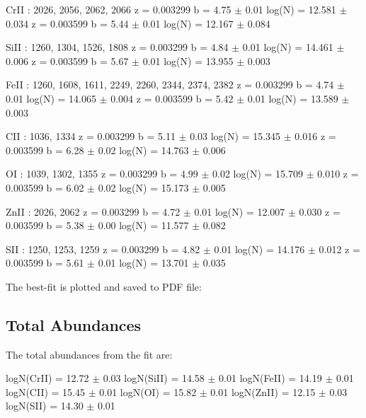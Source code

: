 \documentclass[letterpaper,10pt,english]{sphinxmanual}
\begin{document}
%
\begin{sphinxVerbatim}[commandchars=\\\{\}]
CrII : 2026, 2056, 2062, 2066
    z = 0.003299    b = 4.75 \(\pm\) 0.01  log(N) = 12.581 \(\pm\) 0.034
    z = 0.003599    b = 5.44 \(\pm\) 0.01  log(N) = 12.167 \(\pm\) 0.084

SiII : 1260, 1304, 1526, 1808
    z = 0.003299    b = 4.84 \(\pm\) 0.01  log(N) = 14.461 \(\pm\) 0.006
    z = 0.003599    b = 5.67 \(\pm\) 0.01  log(N) = 13.955 \(\pm\) 0.003

FeII : 1260, 1608, 1611, 2249, 2260, 2344, 2374, 2382
    z = 0.003299    b = 4.74 \(\pm\) 0.01  log(N) = 14.065 \(\pm\) 0.004
    z = 0.003599    b = 5.42 \(\pm\) 0.01  log(N) = 13.589 \(\pm\) 0.003

CII : 1036, 1334
    z = 0.003299    b = 5.11 \(\pm\) 0.03  log(N) = 15.345 \(\pm\) 0.016
    z = 0.003599    b = 6.28 \(\pm\) 0.02  log(N) = 14.763 \(\pm\) 0.006

OI : 1039, 1302, 1355
    z = 0.003299    b = 4.99 \(\pm\) 0.02  log(N) = 15.709 \(\pm\) 0.010
    z = 0.003599    b = 6.02 \(\pm\) 0.02  log(N) = 15.173 \(\pm\) 0.005

ZnII : 2026, 2062
    z = 0.003299    b = 4.72 \(\pm\) 0.01  log(N) = 12.007 \(\pm\) 0.030
    z = 0.003599    b = 5.38 \(\pm\) 0.00  log(N) = 11.577 \(\pm\) 0.082

SII : 1250, 1253, 1259
    z = 0.003299    b = 4.82 \(\pm\) 0.01  log(N) = 14.176 \(\pm\) 0.012
    z = 0.003599    b = 5.61 \(\pm\) 0.01  log(N) = 13.701 \(\pm\) 0.035
\end{sphinxVerbatim}

The best-fit is plotted and saved to PDF file:  


\subsection{Total Abundances}
\label{\detokenize{physical_model_results:total-abundances}}
The total abundances from the fit are:

%
\begin{sphinxVerbatim}[commandchars=\\\{\}]
logN(CrII) = 12.72 \(\pm\) 0.03
logN(SiII) = 14.58 \(\pm\) 0.01
logN(FeII) = 14.19 \(\pm\) 0.01
logN(CII) = 15.45 \(\pm\) 0.01
logN(OI) = 15.82 \(\pm\) 0.01
logN(ZnII) = 12.15 \(\pm\) 0.03
logN(SII) = 14.30 \(\pm\) 0.01
\end{sphinxVerbatim}
\end{document}
